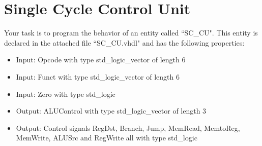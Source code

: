 \documentclass[a4paper,12pt]{article}
\begin{document}
\pagestyle{empty}
\setlength{\parindent}{0em}
\section*{Single Cycle Control Unit}

Your task is to program the behavior of an entity called ``SC\_CU". This entity is declared in the attached file ``SC\_CU.vhdl" and has the following properties:
\begin{itemize}
\item Input:  Opcode with type std\_logic\_vector of length 6
\item Input:  Funct with type std\_logic\_vector of length 6
\item Input:  Zero with type std\_logic
\item Output: ALUControl with type std\_logic\_vector of length 3
\item Output: Control signals RegDst, Branch, Jump, MemRead, MemtoReg, MemWrite, ALUSrc and RegWrite all with type std\_logic
\end{itemize}
\end{document}

